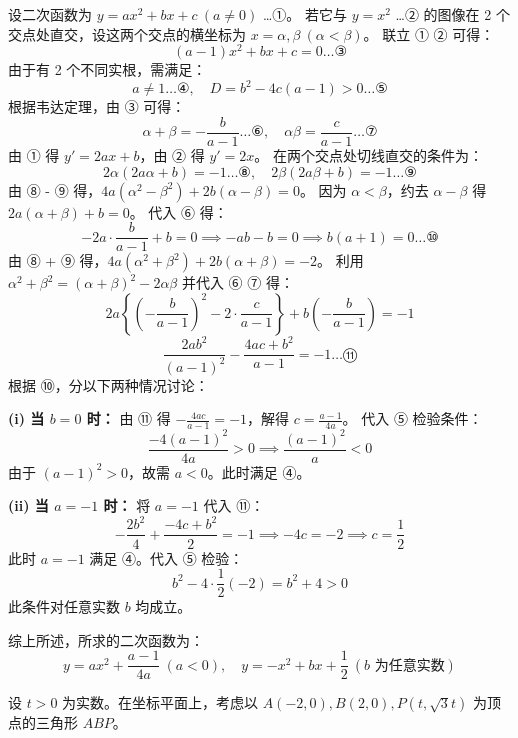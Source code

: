 \begin{questions}
\begin{solution}
    设二次函数为 $y = ax^2 + bx + c \ (a \ne 0)$ \dots ①。
    若它与 $y = x^2$ \dots ② 的图像在 2 个交点处直交，设这两个交点的横坐标为 $x = \alpha, \beta \ (\alpha < \beta)$。
    联立 ① ② 可得：
    \[
    (a - 1)x^2 + bx + c = 0 \dots ③ \text{}
    \]
    由于有 2 个不同实根，需满足：
    \[
    a \ne 1 \dots ④, \quad D = b^2 - 4c(a - 1) > 0 \dots ⑤ \text{}
    \]
    根据韦达定理，由 ③ 可得：
    \[
    \alpha + \beta = -\frac{b}{a - 1} \dots ⑥, \quad \alpha\beta = \frac{c}{a - 1} \dots ⑦ \text{}
    \]
    由 ① 得 $y' = 2ax + b$，由 ② 得 $y' = 2x$。
    在两个交点处切线直交的条件为：
    \[
    2\alpha(2a\alpha + b) = -1 \dots ⑧, \quad 2\beta(2a\beta + b) = -1 \dots ⑨ \text{}
    \]
    由 ⑧ - ⑨ 得，$4a(\alpha^2 - \beta^2) + 2b(\alpha - \beta) = 0$。
    因为 $\alpha < \beta$，约去 $\alpha - \beta$ 得 $2a(\alpha + \beta) + b = 0$。
    代入 ⑥ 得：
    \[
    -2a \cdot \frac{b}{a - 1} + b = 0 \implies -ab - b = 0 \implies b(a + 1) = 0 \dots ⑩ \text{}
    \]
    由 ⑧ + ⑨ 得，$4a(\alpha^2 + \beta^2) + 2b(\alpha + \beta) = -2$。
    利用 $\alpha^2 + \beta^2 = (\alpha + \beta)^2 - 2\alpha\beta$ 并代入 ⑥ ⑦ 得：
    \[
    2a \left\{ \left( -\frac{b}{a-1} \right)^2 - 2 \cdot \frac{c}{a-1} \right\} + b \left( -\frac{b}{a-1} \right) = -1
    \]
    \[
    \frac{2ab^2}{(a-1)^2} - \frac{4ac + b^2}{a-1} = -1 \dots ⑪ \text{}
    \]
    根据 ⑩，分以下两种情况讨论：

    \textbf{(i) 当 $b = 0$ 时：}
    由 ⑪ 得 $-\frac{4ac}{a - 1} = -1$，解得 $c = \frac{a - 1}{4a}$。
    代入 ⑤ 检验条件：
    \[
    \frac{-4(a-1)^2}{4a} > 0 \implies \frac{(a-1)^2}{a} < 0
    \]
    由于 $(a-1)^2 > 0$，故需 $a < 0$。此时满足 ④。

    \textbf{(ii) 当 $a = -1$ 时：}
    将 $a = -1$ 代入 ⑪：
    \[
    -\frac{2b^2}{4} + \frac{-4c + b^2}{2} = -1 \implies -4c = -2 \implies c = \frac{1}{2} \text{}
    \]
    此时 $a = -1$ 满足 ④。代入 ⑤ 检验：
    \[
    b^2 - 4 \cdot \frac{1}{2}(-2) = b^2 + 4 > 0 \text{}
    \]
    此条件对任意实数 $b$ 均成立。

    综上所述，所求的二次函数为：
    \[
    y = ax^2 + \frac{a - 1}{4a} \ (a < 0), \quad y = -x^2 + bx + \frac{1}{2} \ (b \text{ 为任意实数}) \text{}
    \]
\end{solution}

    \question
设 $t > 0$ 为实数。在坐标平面上，考虑以 $A(-2, 0), B(2, 0), P(t, \sqrt{3}t)$ 为顶点的三角形 $ABP$。

\end{questions}
